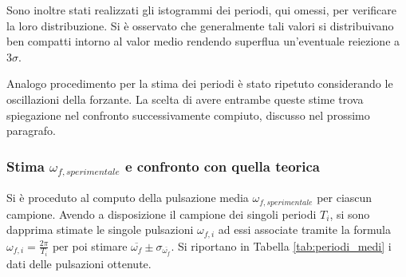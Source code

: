 \documentclass[a4paper,11pt,oneside]{article}
\begin{document}
Sono inoltre stati realizzati gli istogrammi dei periodi, qui omessi, per verificare la loro distribuzione. Si è osservato che generalmente tali valori si distribuivano ben compatti intorno al valor medio rendendo superflua un'eventuale reiezione a $3 \sigma$.

Analogo procedimento per la stima dei periodi è stato ripetuto considerando le oscillazioni della forzante. La scelta di avere entrambe queste stime trova spiegazione nel confronto successivamente compiuto, discusso nel prossimo paragrafo.

\subsubsection{Stima $\omega_{f, sperimentale}$ e confronto con quella teorica}
Si è proceduto al computo della pulsazione media $\omega_{f, sperimentale}$ per ciascun campione. Avendo a disposizione il campione dei singoli periodi $T_{i}$, si sono dapprima stimate le singole pulsazioni $\omega_{f, i}$ ad essi associate tramite la formula $\omega_{f, i}=\frac{2\pi}{T_{i}}$ per poi stimare $\overline{\omega_{f}}\pm \sigma_{\overline{\omega_{f}}}$.
Si riportano in Tabella \ref{tab:periodi_medi} i dati delle pulsazioni ottenute.
\end{document}
